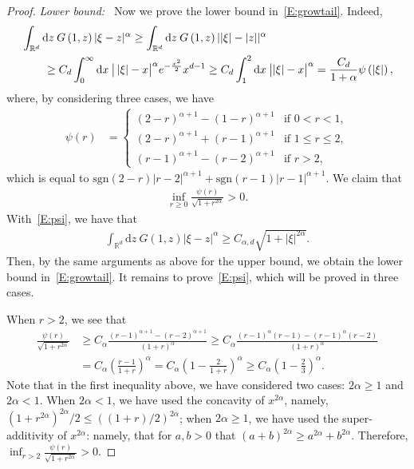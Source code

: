 \documentclass[sn-mathphys]{sn-jnl}%
\renewcommand{\R}{\mathbb{R}}
\newcommand{\ud}{\ensuremath{\mathrm{d}}}
\numberwithin{equation}{section}
\theoremstyle{thmstyleone}%
\theoremstyle{thmstyletwo}%
\theoremstyle{thmstylethree}%
\begin{document}
\begin{proof}
  \noindent\textit{Lower bound:~} Now we prove the lower bound in~\eqref{E:growtail}. Indeed,
  \begin{align*}
    \MoveEqLeft \int_{\R^d}  \ud z\: G\left(1,z\right) \lvert \xi-z \rvert^\alpha
      \ge \int_{\R^d} \ud z\: G\left(1,z\right) \lvert \lvert\xi\rvert - \lvert z \rvert \rvert^\alpha \\
    & \ge {C_d} \int_0^\infty \ud x\: \big\lvert \left\lvert\xi\right\rvert - x \big\rvert^\alpha e^{-\frac{x^2}{2}}x^{d-1}
      \ge C_d \int_1^2 \ud x\: \big\lvert \lvert\xi\rvert - x \big\rvert^\alpha
      = \frac{C_d}{1+\alpha} \psi\left(\lvert\xi\rvert\right),
  \end{align*}
  where, by considering three cases, we have
  \begin{align*}
    \psi(r)
    & =
    \begin{cases}
      (2-r)^{\alpha+1} - (1-r)^{\alpha+1} & \text{if $0<r<1$},        \\
      (2-r)^{\alpha+1} + (r-1)^{\alpha+1} & \text{if $1\le r \le 2$}, \\
      (r-1)^{\alpha+1} - (r-2)^{\alpha+1} & \text{if $r > 2$},
    \end{cases}
  \end{align*}
  which is equal to $\text{sgn}(2-r)\lvert r-2 \rvert^{\alpha+1} + \text{sgn}(r-1) \lvert r-1 \rvert^{\alpha+1}$.
  We claim that
  \begin{align}\label{E:psi}
    \inf_{r\ge 0} \frac{\psi(r)}{\sqrt{1+r^{2\alpha}}}>0.
  \end{align}
  With~\eqref{E:psi}, we have that
  \begin{align*}
    \int_{\R^d} \ud z\: G\left(1,z\right) \lvert \xi-z \rvert^\alpha \ge C_{\alpha, d} \sqrt{1+\lvert\xi\rvert^{2\alpha}}.
  \end{align*}
  Then, by the same arguments as above for the upper bound, we obtain the lower bound
  in~\eqref{E:growtail}. It remains to prove~\eqref{E:psi}, which will be proved in three cases.

  When $r>2$, we see that
  \begin{align*}
    \frac{\psi(r)}{\sqrt{1+r^{2\alpha}}}
    & \ge C_\alpha \frac{(r-1)^{\alpha+1}-(r-2)^{\alpha+1}}{(1+r)^\alpha}
      \ge C_\alpha \frac{(r-1)^{\alpha}(r-1)-(r-1)^{\alpha}(r-2)}{(1+r)^\alpha} \\
    & = C_\alpha \left(\frac{r-1}{1+r}\right)^\alpha
      = C_\alpha \left(1-\frac{2}{1+r}\right)^\alpha \ge C_\alpha \left(1-\frac{2}{3}\right)^\alpha.
  \end{align*}
  Note that in the first inequality above, we have considered two cases: $2\alpha \ge 1$ and $2
  \alpha < 1$. When $2\alpha < 1$, we have used the concavity of $x^{2\alpha}$, namely, $ (1 +
  r^{2\alpha})^{2\alpha} / 2 \le ((1+r)/2)^{2\alpha}$; when $2\alpha \ge 1$, we have used the
  super-additivity of $x^{2\alpha}$: namely, that for $a,b>0$ that $ (a+b)^{2\alpha}\ge a^{2\alpha}
  + b^{2\alpha}$. Therefore, $\inf_{r>2} \frac{\psi(r)}{\sqrt{1+r^{2\alpha}}} >0$.


\end{proof}
\end{document}
